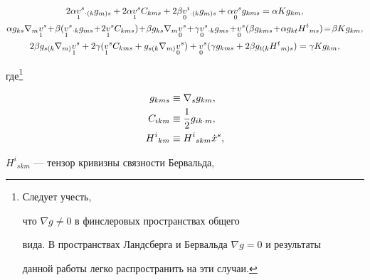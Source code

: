 \begin{gather}


2\alpha \sd{v}{1}^{s}{}_{\cdot (k}g_{m)s} +


2\alpha \sd{v}{1}^{s}C_{kms} +


2\beta \sd{v}{0}^{i}{}_{\cdot (k}g_{m)s} +


\alpha \sd{v}{0}^{s}g_{kms} =


\alpha Kg_{km},\notag \\


%


\alpha g_{ks}\nabla_m\sd{v}{1}^{s}\!+\!


\beta (\sd{v}{1}^{s}{}_{\cdot k}g_{ms}\! +\! 2\sd{v}{1}^{s}C_{kms})\!+\!


\beta g_{ks}\nabla_{m}\sd{v}{0}^{s}\!+\!


\gamma\sd{v}{0}^{s}{}_{\cdot k}g_{ms}\!+\!


\sd{v}{0}^{s}(\beta g_{kms}\!+\!\alpha g_{kt}H^{t}{}_{ms})\! =\!


\beta Kg_{km}, \\


%


2\beta g_{s(k}\nabla_{m)}\sd{v}{1}^{s} +


2\gamma (\sd{v}{1}^{s}C_{kms} + g_{s(k}\nabla_{m)}\sd{v}{0}^{s}) +


\sd{v}{0}^{s}(\gamma g_{kms} + 2\beta g_{t(k}H^{t}{}_{m)s}) =


\gamma Kg_{km}\notag ,


\end{gather}


где\footnote{Следует учесть,


что $\nabla g \ne 0$ в финслеровых пространствах общего


вида. В пространствах Ландсберга и Бервальда $\nabla g = 0$ и результаты


данной работы легко распространить на эти случаи.}


\begin{align*}


g_{kms} &\equiv \nabla_{s}g_{km}, \\


C_{ikm} &\equiv \frac{1}{2}g_{ik\cdot m},\\


H^{i}{}_{km} &\equiv H^{i}{}_{skm}\xt^{s},


\end{align*}


$H^{i}{}_{skm}$ --- тензор кривизны связности Бервальда,


